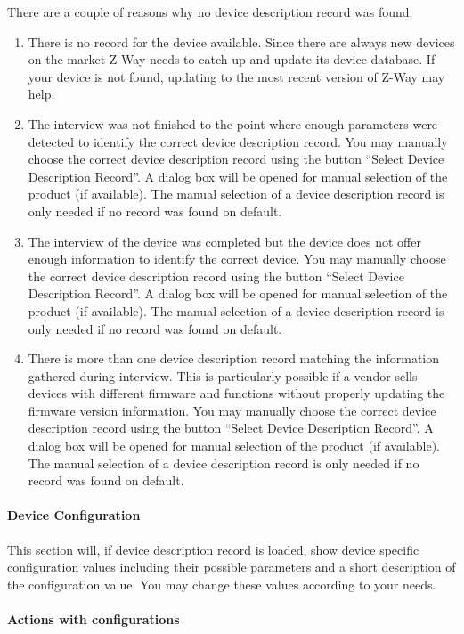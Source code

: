 There are a couple of reasons why no device description record was found:
\begin{enumerate}
\item There is no record for the device available. Since there are always new devices on the market Z-Way needs to catch up and update its device database. If your device is not found, updating to the most recent version of Z-Way may help.
\item The interview was not finished to the point where enough parameters were detected to identify the correct device description record. You may manually choose the correct device description record using the button “Select Device Description Record”. A dialog box will be opened for manual selection of the product (if available). The manual selection of a device description record is only needed if no record was found on default.  
\item The interview of the device was completed but the device does not offer enough information to identify the correct device. You may manually choose the correct device description record using the button “Select Device Description Record”. A dialog box will be opened for manual selection of the product (if available). The manual selection of a device description record is only needed if no record was found on default.
\item There is more than one device description record matching the information gathered during interview.  This is particularly possible if a vendor sells devices with different firmware and functions without properly updating the firmware version information. You may manually choose the correct device description record using the button “Select Device Description Record”. A dialog box will be opened for manual selection of the product (if available). The manual selection of a device description record is only needed if no record was found on default.
\end{enumerate}

\paragraph{Device Configuration}

This section will, if device description record is loaded,  show device specific configuration values including their possible parameters and a short description of the configuration value. You may change these values according to your needs.

\paragraph{Actions with configurations}


